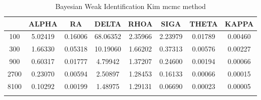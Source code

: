 \documentclass[a4paper,10pt]{article}
\begin{document}
\centering
\begin{longtable}{cccccccc}
\toprule
 & ALPHA & RA & DELTA & RHOA & SIGA & THETA & KAPPA \\
\midrule
100 & 5.02419 & 0.16006 & 68.06352 & 2.35966 & 2.23979 & 0.01789 & 0.00460 \\
300 & 1.66330 & 0.05318 & 10.19060 & 1.66202 & 0.37313 & 0.00576 & 0.00227 \\
900 & 0.60317 & 0.01777 & 4.79942 & 1.37207 & 0.24600 & 0.00194 & 0.00066 \\
2700 & 0.23070 & 0.00594 & 2.50897 & 1.28453 & 0.16133 & 0.00066 & 0.00015 \\
8100 & 0.10292 & 0.00199 & 1.48975 & 1.29131 & 0.06690 & 0.00023 & 0.00005 \\
\bottomrule
\caption{Bayesian Weak Identification Kim mcmc method}
\label{table:tbl:WeakKim_mcmc}
\end{longtable}
\end{document}

